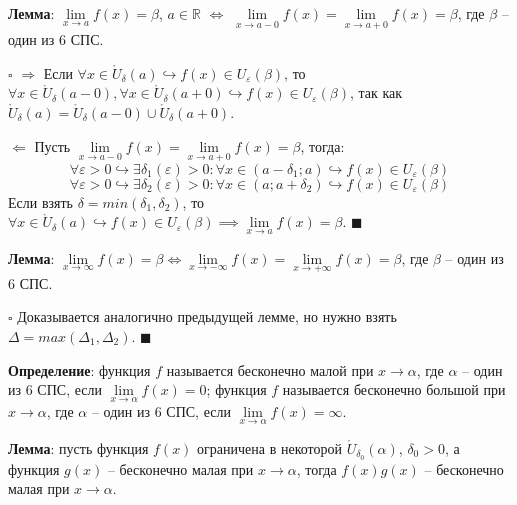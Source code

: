 \documentclass[12pt, a4paper, reqno]{article}
\begin{document}
    \textbf{Лемма}: $\lim\limits_{x\to a} f(x) = \beta$, $a\in\mathbb{R}$ $\iff$
    $\lim\limits_{x\to a-0} f(x) = \lim\limits_{x\to a+0} f(x) = \beta$, где $\beta$ -- один из 6 СПС.

    $\square$ $\boxed{\Rightarrow}$ Если $\forall x\in\mathring U_{\delta}(a) \hookrightarrow f(x)\in
    U_{\varepsilon}(\beta)$, то $\forall x\in \mathring U_{\delta}(a-0), \forall x\in \mathring
    U_{\delta}(a+0) \hookrightarrow f(x)\in U_{\varepsilon}(\beta)$, так как $\mathring
    U_{\delta}(a) = \mathring U_{\delta}(a-0)\cup \mathring U_{\delta}(a+0)$.

    $\boxed{\Leftarrow}$ Пусть $\lim\limits_{x\to a-0} f(x) = \lim\limits_{x\to a+0} f(x) = \beta$, тогда:
    \begin{equation*}
        \forall\varepsilon > 0 \hookrightarrow\exists\delta_1(\varepsilon) > 0:
        \forall x\in (a - \delta_1; a) \hookrightarrow f(x)\in U_{\varepsilon}(\beta)
    \end{equation*}
    \begin{equation*}
        \forall\varepsilon > 0 \hookrightarrow\exists\delta_2(\varepsilon) > 0: \forall x\in (a;
        a + \delta_2) \hookrightarrow f(x)\in U_{\varepsilon}(\beta)
    \end{equation*}
    Если взять $\delta = min(\delta_1, \delta_2)$, то $\forall x\in \mathring U_{\delta}(a)
    \hookrightarrow f(x)\in U_{\varepsilon}(\beta) \implies \lim\limits_{x\to a} f(x) = \beta$.
    $\blacksquare$

    \textbf{Лемма}: $\lim\limits_{x\to\infty} f(x) = \beta \iff \lim\limits_{x\to -\infty} f(x) =
    \lim\limits_{x\to +\infty} f(x) = \beta$, где $\beta$ -- один из 6 СПС.

    $\square$ Доказывается аналогично предыдущей лемме, но нужно взять $\Delta = max(\Delta_1,
    \Delta_2)$. $\blacksquare$

    \textbf{Определение}: функция $f$ называется бесконечно малой при $x\to\alpha$, где $\alpha$ --
    один из 6 СПС, если $\lim\limits_{x\to\alpha} f(x) = 0$; функция $f$ называется бесконечно
    большой при $x\to\alpha$, где $\alpha$ -- один из 6 СПС, если $\lim\limits_{x\to\alpha}
    f(x) = \infty$.

    \textbf{Лемма}: пусть функция $f(x)$ ограничена в некоторой $\mathring U_{\delta_0}(\alpha)$,
    $\delta_0 > 0$, а функция $g(x)$ -- бесконечно малая при $x\to\alpha$, тогда $f(x)g(x)$ --
    бесконечно малая при $x\to\alpha$.
\end{document}
